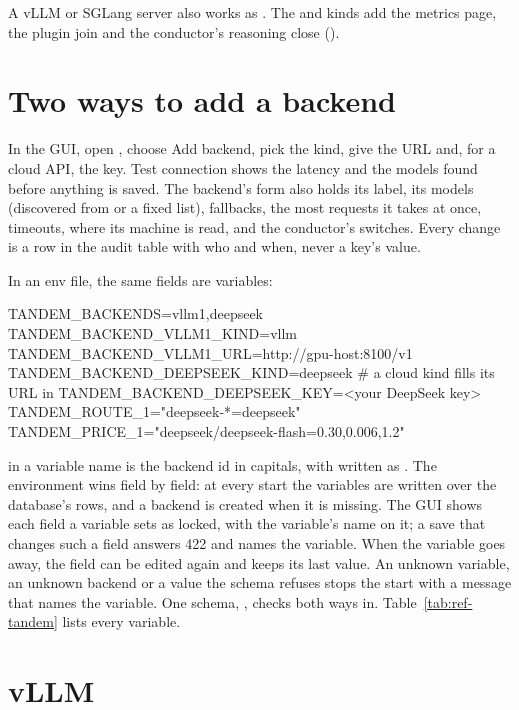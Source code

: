 A vLLM or SGLang server also works as . The  and  kinds add the metrics page, the plugin join and the conductor's reasoning close ().

\section{Two ways to add a backend}

In the GUI, open , choose Add backend, pick the kind, give the URL and, for a cloud API, the key. Test connection shows the latency and the models found before anything is saved. The backend's form also holds its label, its models (discovered from  or a fixed list), fallbacks, the most requests it takes at once, timeouts, where its machine is read, and the conductor's switches. Every change is a row in the audit table with who and when, never a key's value.

In an env file, the same fields are  variables:

\begin{shell}
TANDEM_BACKENDS=vllm1,deepseek
TANDEM_BACKEND_VLLM1_KIND=vllm
TANDEM_BACKEND_VLLM1_URL=http://gpu-host:8100/v1
TANDEM_BACKEND_DEEPSEEK_KIND=deepseek          # a cloud kind fills its URL in
TANDEM_BACKEND_DEEPSEEK_KEY=<your DeepSeek key>
TANDEM_ROUTE_1="deepseek-*=deepseek"
TANDEM_PRICE_1="deepseek/deepseek-flash=0.30,0.006,1.2"
\end{shell}

 in a variable name is the backend id in capitals, with \code{-} written as \code{_}. The environment wins field by field: at every start the variables are written over the database's rows, and a backend is created when it is missing. The GUI shows each field a variable sets as locked, with the variable's name on it; a save that changes such a field answers 422 and names the variable. When the variable goes away, the field can be edited again and keeps its last value. An unknown variable, an unknown backend or a value the schema refuses stops the start with a message that names the variable. One schema, , checks both ways in. Table~\ref{tab:ref-tandem} lists every variable.

\section{vLLM}

